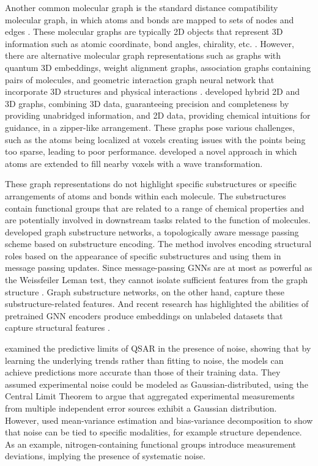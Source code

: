 Another common molecular graph is the standard distance compatibility molecular graph, in which atoms and bonds are mapped to sets of nodes and edges \citep{David2020, Hnig2022}. These molecular graphs are typically 2D objects that represent 3D information such as atomic coordinate, bond angles, chirality, etc. \citep{David2020}. However, there are alternative molecular graph representations such as graphs with quantum 3D embeddings, weight alignment graphs, association graphs containing pairs of molecules, and geometric interaction graph neural network that incorporate 3D structures and physical interactions \citep{Hnig2022, yan2023, Yang2023GIGN}. \cite{Du2022} developed hybrid 2D and 3D graphs, combining 3D data, guaranteeing precision and completeness by providing unabridged information, and 2D data, providing chemical intuitions for guidance, in a zipper-like arrangement. These graphs pose various challenges, such as the atoms being localized at voxels creating issues with the points being too sparse, leading to poor performance. \cite{Kuzminykh2018} developed a novel approach in which atoms are extended to fill nearby voxels with a wave transformation.
      
These graph representations do not highlight specific substructures or specific arrangements of atoms and bonds within each molecule. The substructures contain functional groups that are related to a range of chemical properties and are potentially involved in downstream tasks related to the function of molecules. \cite{Bouritsas2023} developed graph substructure networks, a topologically aware message passing scheme based on substructure encoding. The method involves encoding structural roles based on the appearance of specific substructures and using them in message passing updates. Since message-passing GNNs are at most as powerful as the Weissfeiler Leman test, they cannot isolate sufficient features from the graph structure \citep{Bouritsas2023}. Graph substructure networks, on the other hand, capture these substructure-related features. And recent research has highlighted the abilities of pretrained GNN encoders produce embeddings on unlabeled datasets that capture structural features \citep{kishimoto2023, ross2022}. 

\cite{Kolmar2021} examined the predictive limits of QSAR in the presence of noise, showing that by learning the underlying trends rather than fitting to noise, the models can achieve predictions more accurate than those of their training data. They assumed experimental noise could be modeled as Gaussian-distributed, using the Central Limit Theorem to argue that aggregated experimental measurements from multiple independent error sources exhibit a Gaussian distribution. However, \cite{Heid2023} used mean-variance estimation and bias-variance decomposition to show that noise can be tied to specific modalities, for example structure dependence. As an example, nitrogen-containing functional groups introduce measurement deviations, implying the presence of systematic noise. 

